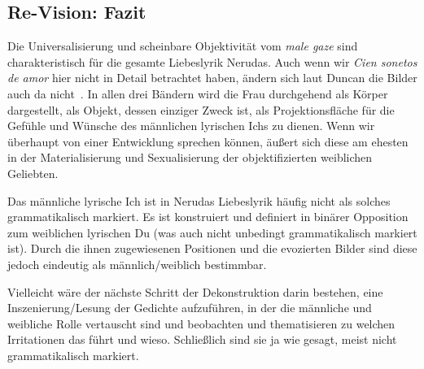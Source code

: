 \subsection{Re-Vision: Fazit}

Die Universalisierung und scheinbare Objektivität vom \textit{male gaze} sind charakteristisch für die gesamte Liebeslyrik Nerudas.
Auch wenn wir \textit{Cien sonetos de amor} hier nicht in Detail betrachtet haben, ändern sich laut Duncan die Bilder auch da nicht~\cite{Duncan1992}.
In allen drei Bändern wird die Frau durchgehend als Körper dargestellt, als Objekt, dessen einziger Zweck ist, als Projektionsfläche für die Gefühle und Wünsche des männlichen lyrischen Ichs zu dienen.
Wenn wir überhaupt von einer Entwicklung sprechen können, äußert sich diese am ehesten in der Materialisierung und Sexualisierung der objektifizierten weiblichen Geliebten.

Das männliche lyrische Ich ist in Nerudas Liebeslyrik häufig nicht als solches grammatikalisch markiert.
Es ist konstruiert und definiert in binärer Opposition zum weiblichen lyrischen Du (was auch nicht unbedingt grammatikalisch markiert ist).
Durch die ihnen zugewiesenen Positionen und die evozierten Bilder sind diese jedoch eindeutig als männlich/weiblich bestimmbar.

Vielleicht wäre der nächste Schritt der Dekonstruktion %
darin bestehen, eine Inszenierung/Lesung der Gedichte aufzuführen, in der die männliche und weibliche Rolle vertauscht sind und beobachten und thematisieren zu welchen Irritationen das führt und wieso.
Schließlich sind sie ja wie gesagt, meist nicht grammatikalisch markiert.
